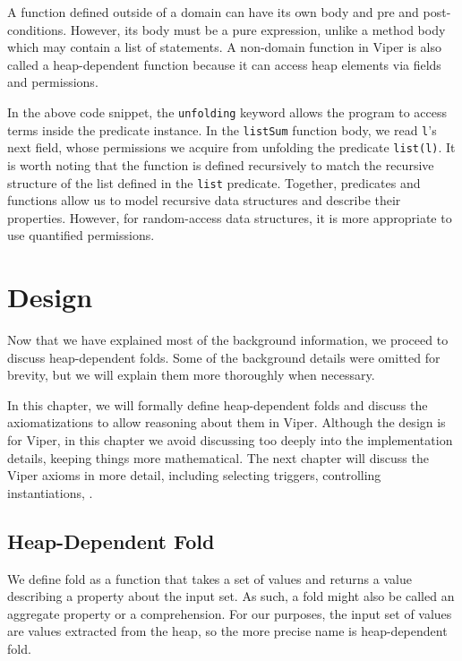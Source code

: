 \documentclass[msc,oneside]{ubcthesis}
\begin{document}
A function defined outside of a domain can have its own body and pre and post-conditions. However, its body must be a pure expression, unlike a method body which may contain a list of statements. A non-domain function in Viper is also called a heap-dependent function because it can access heap elements via fields and permissions.

In the above code snippet, the \lstinline|unfolding| keyword allows the program to access terms inside the predicate instance. In the \lstinline|listSum| function body, we read \lstinline|l|’s next field, whose permissions we acquire from unfolding the predicate \lstinline|list(l)|. It is worth noting that the function is defined recursively to match the recursive structure of the list defined in the \lstinline|list| predicate. Together, predicates and functions allow us to model recursive data structures and describe their properties. However, for random-access data structures, it is more appropriate to use quantified permissions.

\chapter{Design}
Now that we have explained most of the background information, we proceed to discuss heap-dependent folds. Some of the background details were omitted for brevity, but we will explain them more thoroughly when necessary.

In this chapter, we will formally define heap-dependent folds and discuss the axiomatizations to allow reasoning about them in Viper. Although the design is for Viper, in this chapter we avoid discussing too deeply into the implementation details, keeping things more mathematical. The next chapter will discuss the Viper axioms in more detail, including selecting triggers, controlling instantiations, \etc.

\section{Heap-Dependent Fold}
We define fold as a function that takes a set of values and returns a value describing a property about the input set. As such, a fold might also be called an aggregate property or a comprehension. For our purposes, the input set of values are values extracted from the heap, so the more precise name is heap-dependent fold.
\end{document}
